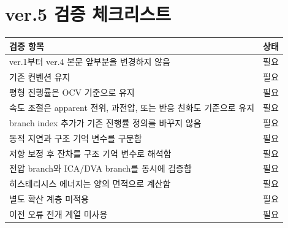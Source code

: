 \documentclass[11pt,a4paper]{article}
\begin{document}
\section{ver.5 검증 체크리스트}
\begin{longtable}{p{}p{}}
\toprule
검증 항목 & 상태 \\
\midrule
\endhead
ver.1부터 ver.4 본문 앞부분을 변경하지 않음 & 필요 \\
기존 컨벤션 유지 & 필요 \\
평형 진행률은 OCV 기준으로 유지 & 필요 \\
속도 조절은 apparent 전위, 과전압, 또는 반응 친화도 기준으로 유지 & 필요 \\
branch index 추가가 기존 진행률 정의를 바꾸지 않음 & 필요 \\
동적 지연과 구조 기억 변수를 구분함 & 필요 \\
저항 보정 후 잔차를 구조 기억 변수로 해석함 & 필요 \\
전압 branch와 ICA/DVA branch를 동시에 검증함 & 필요 \\
히스테리시스 에너지는 양의 면적으로 계산함 & 필요 \\
별도 확산 계층 미적용 & 필요 \\
이전 오류 전개 계열 미사용 & 필요 \\
\bottomrule
\end{longtable}
\end{document}
